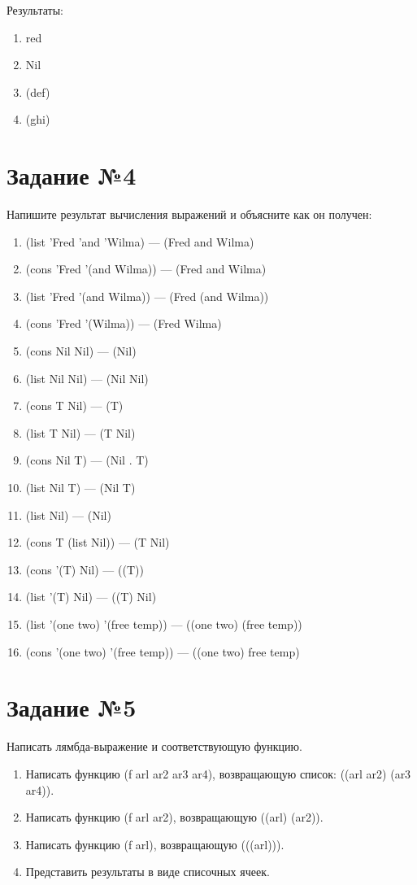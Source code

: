 Результаты:

\begin{enumerate}
    \item red
    \item Nil
    \item (def)
    \item (ghi)
\end{enumerate}

\chapter{Задание №4}

Напишите результат вычисления выражений и объясните как он получен:

\begin{enumerate}
    \item (list 'Fred 'and 'Wilma) --- (Fred and Wilma)
    \item (cons 'Fred '(and Wilma)) --- (Fred and Wilma)
    \item (list 'Fred '(and Wilma)) --- (Fred (and Wilma))
    \item (cons 'Fred '(Wilma)) --- (Fred Wilma)
    \item (cons Nil Nil) --- (Nil)
    \item (list Nil Nil) --- (Nil Nil)
    \item (cons T Nil) --- (T)
    \item (list T Nil) --- (T Nil)
    \item (cons Nil T) --- (Nil . T)
    \item (list Nil T) --- (Nil T)
    \item (list Nil) --- (Nil)
    \item (cons T (list Nil)) --- (T Nil)
    \item (cons '(T) Nil) --- ((T))
    \item (list '(T) Nil) --- ((T) Nil)
    \item (list '(one two) '(free temp)) --- ((one two) (free temp))
    \item (cons '(one two) '(free temp)) --- ((one two) free temp)
\end{enumerate}

\chapter{Задание №5}

Написать лямбда-выражение и соответствующую функцию.
\begin{enumerate}
    \item Написать функцию (f arl ar2 ar3 ar4), возвращающую список: ((arl ar2) (ar3 ar4)).
    \item Написать функцию (f arl ar2), возвращающую ((arl) (ar2)).
    \item Написать функцию (f arl), возвращающую (((arl))).
    \item Представить результаты в виде списочных ячеек.
\end{enumerate}

